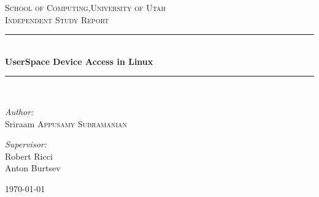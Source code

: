 \documentclass[11pt,titlepage,a4paper]{article}
\newcommand{\HRule}{\rule{\linewidth}{0.5mm}}
\begin{document}
\begin{titlepage}
\begin{center}

\textsc{\LARGE School of Computing,University of Utah}\\[1.5cm]

\textsc{\Large Independent Study Report}\\[0.5cm]

\HRule \\[0.4cm]
{ \huge \bfseries UserSpace Device Access in Linux \\[0.4cm] }

\HRule \\[1.5cm]

\begin{minipage}{0.4\textwidth}
\begin{flushleft} \large
\emph{Author:}\\
Sriraam \textsc{Appusamy Subramanian}
\end{flushleft}
\end{minipage}
\begin{minipage}{0.4\textwidth}
\begin{flushright} \large
\emph{Supervisor:} \\
Robert Ricci \\
Anton Burtsev
\end{flushright}
\end{minipage}

\vfill

{\large \today}

\end{center}
\end{titlepage}
\end{document}
